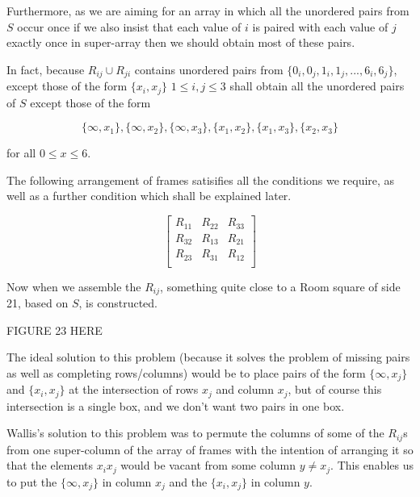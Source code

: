 \documentclass[
  11pt,
  a4paper]{book}
\newcounter{example}
\begin{document}
\begin{example}
Furthermore, as we are aiming for an array in which all the
unordered pairs from $S$ occur once if we also insist that
each value of $i$ is paired with each value of $j$ exactly
once in super-array then we should obtain most of these
pairs.

In fact, because $R_{ij} \cup R_{ji}$ contains
unordered pairs from $\{0_i,0_j,1_i,1_j,...,6_i,6_j\}$,
except those of the form $\{x_i,x_j\}$ $1 \leq i,j \leq 3$
shall obtain all the unordered pairs of $S$ except those of
the form

\begin{equation}
\{\infty, x_1\}, \{\infty, x_2\}, \{\infty, x_3\}, \{x_1, x_2\}, \{x_1, x_3\}, \{x_2, x_3\}
\end{equation}

for all $0 \leq x \leq 6$.

The following arrangement of frames satisifies all the
conditions we require, as well as a further condition which
shall be explained later.

\begin{equation}
  \begin{bmatrix}
    R_{11} & R_{22} & R_{33} \\
    R_{32} & R_{13} & R_{21} \\
    R_{23} & R_{31} & R_{12} \\
  \end{bmatrix}
\end{equation}

Now when we assemble the $R_{ij}$, something quite close to
a Room square of side 21, based on $S$, is constructed.

FIGURE 23 HERE

\end{example}

The ideal solution to this problem (because it solves the problem of
missing pairs as well as completing rows/columns) would be to place
pairs of the form \(\{\infty, x_j\}\) and \(\{x_i, x_j\}\) at the
intersection of rows \(x_j\) and column \(x_j\), but of course this
intersection is a single box, and we don't want two pairs in one box.

Wallis's solution to this problem was to permute the columns of some of
the \(R_{ij}\)s from one super-column of the array of frames with the
intention of arranging it so that the elements \(x_i x_j\) would be
vacant from some column \(y \neq x_j\). This enables us to put the
\(\{\infty, x_j\}\) in column \(x_j\) and the \(\{x_i,x_j\}\) in column
\(y\).
\end{document}
